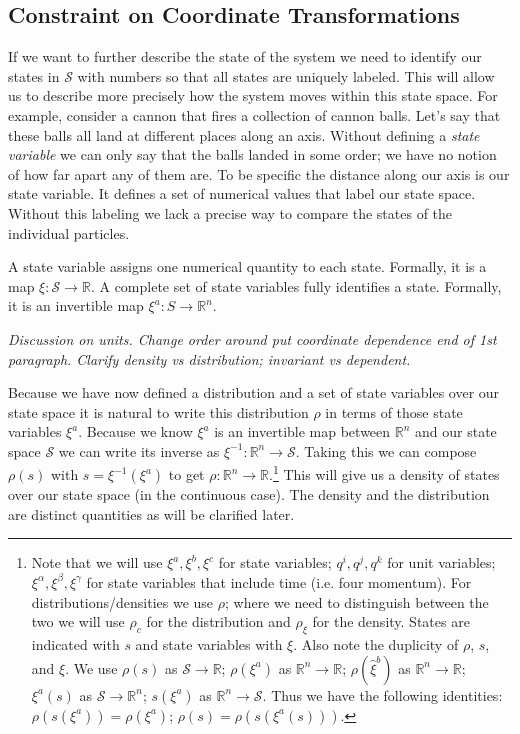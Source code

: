 \documentclass{article}
\begin{document}
\subsection{Constraint on Coordinate Transformations}	

	If we want to further describe the state of the system we need to identify our states in $\mathcal{S}$ with numbers so that all states are uniquely labeled. This will allow us to describe more precisely how the system moves within this state space. For example, consider a cannon that fires a collection of cannon balls. Let's say that these balls all land at different places along an axis. Without defining a \textit{state variable} we can only say that the balls landed in some order; we have no notion of how far apart any of them are. To be specific the distance along our axis is our state variable. It defines a set of numerical values that label our state space. Without this labeling we lack a precise way to compare the states of the individual particles.

\begin{defn}
	A state variable assigns one numerical quantity to each state. Formally, it is a map $\xi : \mathcal{S} \to \mathbb{R}$. A complete set of state variables fully identifies a state. Formally, it is an invertible  map $\xi^a : S \rightarrow \mathbb{R}^n $.
\end{defn}

\emph{Discussion on units. Change order around put coordinate dependence end of 1st paragraph. Clarify density vs distribution; invariant vs dependent.} 
	
	Because we have now defined a distribution and a set of state variables over our state space it is natural to write this distribution $\rho$ in terms of those state variables $\xi^a$. Because we know $\xi^a$ is an invertible map between $\mathbb{R}^n$ and our state space $\mathcal{S}$ we can write its inverse as $\xi^{-1} : \mathbb{R}^n \to \mathcal{S}$. Taking this we can compose $\rho(s)$ with $s = \xi^{-1}(\xi^a)$ to get $\rho : \mathbb{R}^n \to \mathbb{R}$.\footnote{Note that we will use $\xi^a, \xi^b, \xi^c$ for state variables; $q^i, q^j, q^k$ for unit variables; $\xi^\alpha, \xi^\beta, \xi^\gamma$ for state variables that include time (i.e. four momentum). For distributions/densities we use $\rho$; where we need to distinguish between the two we will use $\rho_c$ for the distribution and $\rho_\xi$ for the density. States are indicated with $s$ and state variables with $\xi$. Also note the duplicity of $\rho$, $s$, and $\xi$. We use $\rho(s)$ as $\mathcal{S} \to \mathbb{R}$; $\rho(\xi^a)$ as $\mathbb{R}^n \to \mathbb{R}$; $\rho(\hat{\xi}^b)$ as $\mathbb{R}^n \to \mathbb{R}$; $\xi^a(s)$ as $\mathcal{S} \to \mathbb{R}^n$; $s(\xi^a)$ as $\mathbb{R}^n \to \mathcal{S}$.
Thus we have the following identities: $\rho(s(\xi^a)) = \rho(\xi^a)$; $\rho(s) = \rho(s (\xi^a(s)))$.} This will give us a density of states over our state space (in the continuous case). The density and the distribution are distinct quantities as will be clarified later.
\end{document}
